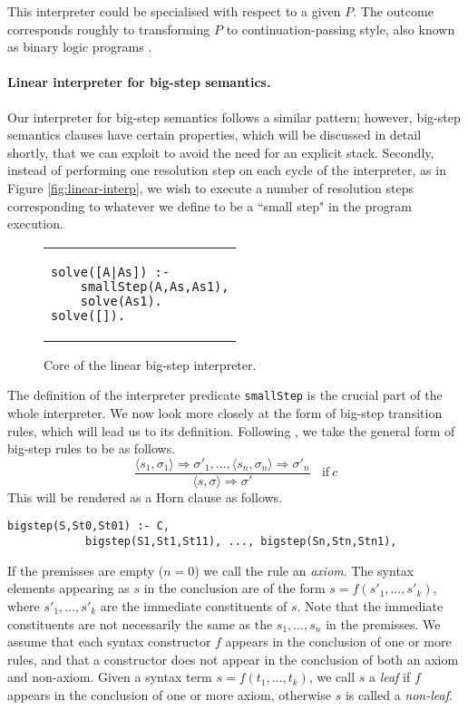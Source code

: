 \documentclass{llncs}
\begin{document}
This interpreter could be specialised with respect to a given $P$.  The outcome corresponds roughly to transforming $P$ to continuation-passing
style, also known as binary logic programs \cite{Demoen}.

\paragraph{Linear interpreter for big-step semantics.} 
Our interpreter for big-step semantics follows a similar pattern; however, big-step semantics clauses have certain
properties, which will be discussed in detail shortly, that we can exploit to avoid the need for an explicit stack.  
Secondly, instead of performing one resolution step on each cycle of the interpreter,
as in Figure \ref{fig:linear-interp}, we wish to execute a number of resolution steps corresponding to whatever we define to be a ``small step" in the 
program execution.  
\begin{figure}
\begin{tabular}{l}
\begin{lstlisting}
solve([A|As]) :- 
	smallStep(A,As,As1),
	solve(As1).
solve([]).
\end{lstlisting}
\end{tabular}
\caption{Core of the linear big-step interpreter.}\label{fig:linear-bigstep}
\end{figure}

The definition of the interpreter predicate \texttt{smallStep} is the crucial part of the whole interpreter.
We now look more closely at the form of big-step transition rules, which will lead us to its definition. 
Following \cite{Nielsons}, we take the general form of big-step rules to
be as follows.
\[
\dfrac{\langle s_1, \sigma_1\rangle \Rightarrow \sigma'_1, \ldots, \langle s_n, \sigma_n\rangle \Rightarrow \sigma'_n}
{\langle s, \sigma\rangle \Rightarrow \sigma'} 
~~~~\mathrm{if }~ c
\]
This will be rendered as a Horn clause as follows.
\begin{lstlisting}
bigstep(S,St0,St01) :- C, 
            bigstep(S1,St1,St11), ..., bigstep(Sn,Stn,Stn1),
\end{lstlisting}
If the premisses are empty ($n=0$) we call the rule an \emph{axiom}.  The syntax elements appearing as $s$ in the conclusion 
are of the form $s=f(s'_1,\ldots,s'_k)$, where $s'_1,\ldots,s'_k$ are the immediate constituents of $s$.  Note that the immediate constituents 
are not necessarily the same as the $s_1,\ldots,s_n$ in the premisses.  We assume that each syntax constructor $f$ appears in the conclusion
of one or more rules, and that a constructor does not appear in the conclusion of both an axiom and non-axiom. Given a syntax term $s=f(t_1,\ldots,t_k)$,
we call $s$ a \emph{leaf} if $f$ appears in the conclusion of one or more axiom, otherwise $s$ is called a \emph{non-leaf}.
\end{document}
